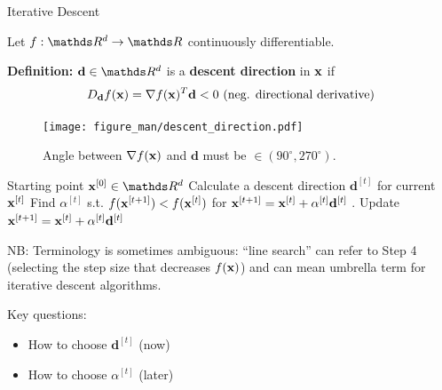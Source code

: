 \documentclass[11pt,compress,t,notes=noshow, xcolor=table]{beamer}
\begin{document}
\begin{vbframe}{Iterative Descent}

	Let $f: \R^d \to \R$ continuously differentiable.
	
	\lz
	
	\textbf{Definition:} $\mathbf{d}\in \R^d$ is a \textbf{descent direction} in $\mathbf{x}$ if
	$$
	D_\mathbf{d} f(\mathbf{x}) = \nabla f(\mathbf{x}) ^T \mathbf{d} < 0 \text{ (neg. directional derivative)}
	$$

	\begin{figure}
		\texttt{[image: figure\_man/descent\_direction.pdf]} \\
		\begin{footnotesize}
			Angle between $\nabla f(\mathbf{x})$ and $\mathbf{d}$ must be $\in (90^{\circ}, 270^{\circ})$. 
		\end{footnotesize}
	\end{figure}



	\framebreak
	
	\begin{algorithm}[H]
	  \caption{Iterative Descent / Line search}
	  \begin{algorithmic}[1]
	  \State Starting point $\xv^{[0]} \in \R^d$
	    \State Calculate a descent direction $\mathbf{d}^{[t]}$ for current $\mathbf{x}^{[t]}$
	    \State Find $\alpha^{[t]}$ s.t. $f(\mathbf{x}^{[t + 1]}) < f(\mathbf{x}^{[t]})$ for $\mathbf{x}^{[t + 1]} = \mathbf{x}^{[t]} + \alpha^{[t]} \mathbf{d}^{[t]}$
	   .
	    \State Update $\mathbf{x}^{[t + 1]} = \mathbf{x}^{[t]} + \alpha^{[t]} \mathbf{d}^{[t]}$
	  \EndWhile
	  \end{algorithmic}
	\end{algorithm}
	\vspace*{-0.2cm}
	\begin{tiny}
		NB: Terminology is sometimes ambiguous: ``line search'' can refer to Step 4 (selecting the step size that decreases $f(\mathbf{x})$) and can mean umbrella term for iterative descent algorithms. \par
	\end{tiny}

	\lz 

	Key questions: 
	\begin{itemize}
		\item How to choose $\mathbf{d}^{[t]}$ (now)
		\item How to choose $\alpha^{[t]}$ (later)
	\end{itemize}

\end{vbframe}
\end{document}
